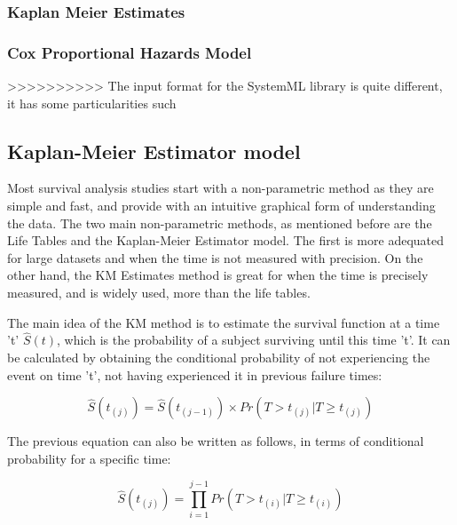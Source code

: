 \documentclass[11pt]{article} %
\begin{document}
      \subsubsection*{Kaplan Meier Estimates}



      \subsubsection*{Cox Proportional Hazards Model}


      >>>>>>>>>> The input format for the SystemML library is quite different, it has some particularities such





  \subsection{Kaplan-Meier Estimator model}

    Most survival analysis studies start with a non-parametric method as they are simple and fast, and provide with an intuitive graphical form of understanding the data. The two main non-parametric methods, as mentioned before are the Life Tables and the Kaplan-Meier Estimator model. The first is more adequated for large datasets and when the time is not measured with precision. On the other hand, the KM Estimates method is great for when the time is precisely measured, and is widely used, more than the life tables.

    The main idea of the KM method is to estimate the survival function at a time 't' $\hat{S}(t)$, which is the probability of a subject surviving until this time 't'. It can be calculated by obtaining the conditional probability of not experiencing the event on time 't', not having experienced it in previous failure times:

    \begin{equation}
      \hat{S}(t_{(j)}) = \hat{S}(t_{(j-1)}) \times Pr(T>t_{(j)}|T \geq t_{(j)})
      \label{eq:KM-eq-surv}
    \end{equation}

    The previous equation can also be written as follows, in terms of conditional probability for a specific time:

    \begin{equation}
      \hat{S}(t_{(j)}) = \prod_{i=1}^{j-1} Pr(T>t_{(i)}|T\geq t_{(i)})
      \label{eq:KM-eq-probab}
    \end{equation}
\end{document}
